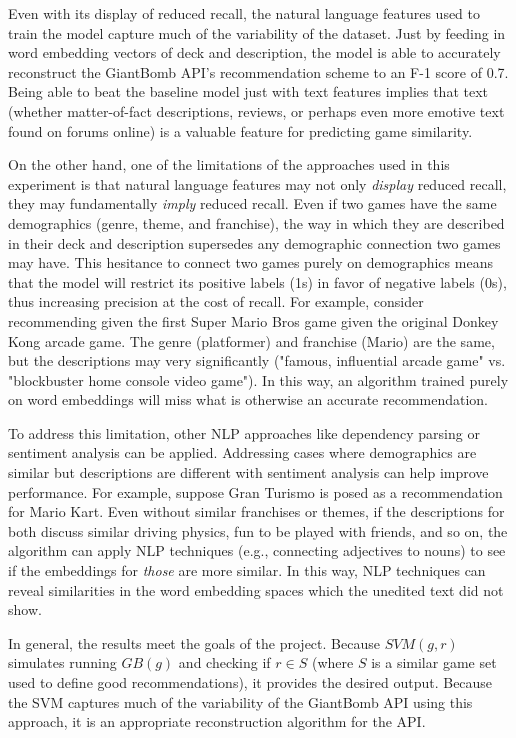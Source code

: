 \documentclass[10pt,twocolumn]{article}
\begin{document}
Even with its display of reduced recall, the natural language features used to train the model capture much of the variability of the dataset. Just by feeding in word embedding vectors of deck and description, the model is able to accurately reconstruct the GiantBomb API's recommendation scheme to an F-1 score of 0.7. Being able to beat the baseline model just with text features implies that text (whether matter-of-fact descriptions, reviews, or perhaps even more emotive text found on forums online) is a valuable feature for predicting game similarity.

On the other hand, one of the limitations of the approaches used in this experiment is that natural language features may not only \textit{display} reduced recall, they may fundamentally \textit{imply} reduced recall.
Even if two games have the same demographics (genre, theme, and franchise), the way in which they are described in their deck and description supersedes any demographic connection two games may have. This hesitance to connect two games purely on demographics means that the model will restrict its positive labels (1s) in favor of negative labels (0s), thus increasing precision at the cost of recall. For example, consider recommending given the first Super Mario Bros game given the original Donkey Kong arcade game. The genre (platformer) and franchise (Mario) are the same, but the descriptions may very significantly ("famous, influential arcade game" vs. "blockbuster home console video game"). In this way, an algorithm trained purely on word embeddings will miss what is otherwise an accurate recommendation. 

To address this limitation, other NLP approaches like dependency parsing or sentiment analysis can be applied. \cite{Ryan_47} Addressing cases where demographics are similar but descriptions are different with sentiment analysis can help improve performance. For example, suppose Gran Turismo is posed as a recommendation for Mario Kart. Even without similar franchises or themes, if the descriptions for both discuss similar driving physics, fun to be played with friends, and so on, the algorithm can apply NLP techniques (e.g., connecting adjectives to nouns) to see if the embeddings for \textit{those} are more similar. \cite{Meidl} In this way, NLP techniques can reveal similarities in the word embedding spaces which the unedited text did not show.

In general, the results meet the goals of the project. Because $SVM(g, r)$ simulates running $GB(g)$ and checking if $r \in S$ (where $S$ is a similar game set used to define good recommendations), it provides the desired output. Because the SVM captures much of the variability of the GiantBomb API using this approach, it is an appropriate reconstruction algorithm for the API. 
\end{document}
